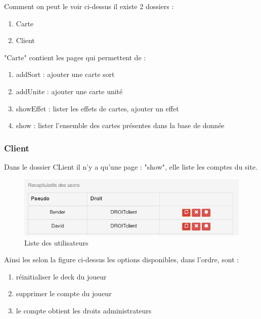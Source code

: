 \documentclass[a4paper,11pt]{report}
\begin{document}
	Comment on peut le voir ci-dessus il existe 2 dossiers :
	\begin{enumerate}
		\item Carte
		\item Client
	\end{enumerate}

	"Carte" contient les pages qui permettent de :
	\begin{enumerate}
		\item addSort : ajouter une carte sort
		\item addUnite : ajouter une carte unité
		\item showEffet : lister les effets de cartes, ajouter un effet
		\item show : lister l'ensemble des cartes présentes dans la base de donnée
	\end{enumerate}

        \subsubsection{Client}
         Dans le dossier CLient il n'y a qu'une page : "show", elle liste les comptes du site. 
        \begin{figure}[th]
      		\begin{center}
        	\includegraphics[scale=0.4]{Assets/liste_user.png}
        	\caption{Liste des utilisateurs}
        	\label{fig5}
      		\end{center}
    	\end{figure}

	Ainsi les selon la figure ci-dessus les options disponibles, dans l'ordre, sont : 
	\begin{enumerate}
		\item réinitialiser le deck du joueur
		\item supprimer le compte du joueur
		\item le compte obtient les droits administrateurs
	\end{enumerate}
         
\end{document}
